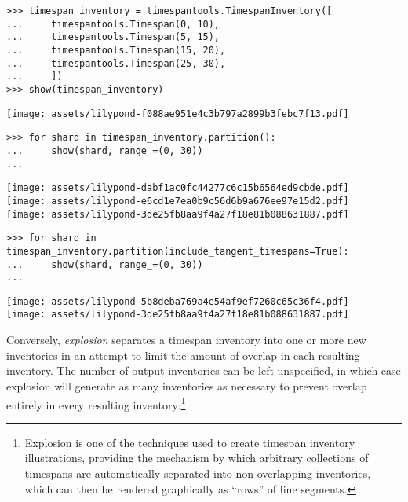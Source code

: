 \begin{abjadbookoutput}
\begin{singlespacing}
\vspace{-0.5\baselineskip}
\begin{verbatim}
>>> timespan_inventory = timespantools.TimespanInventory([
...     timespantools.Timespan(0, 10),
...     timespantools.Timespan(5, 15),
...     timespantools.Timespan(15, 20),
...     timespantools.Timespan(25, 30),
...     ])
>>> show(timespan_inventory)
\end{verbatim}
\noindent\texttt{[image: assets/lilypond-f088ae951e4c3b797a2899b3febc7f13.pdf]}
\begin{verbatim}
>>> for shard in timespan_inventory.partition():
...     show(shard, range_=(0, 30))
...
\end{verbatim}
\noindent\texttt{[image: assets/lilypond-dabf1ac0fc44277c6c15b6564ed9cbde.pdf]}\\
\noindent\texttt{[image: assets/lilypond-e6cd1e7ea0b9c56d6b9a676ee97e15d2.pdf]}\\
\noindent\texttt{[image: assets/lilypond-3de25fb8aa9f4a27f18e81b088631887.pdf]}
\begin{verbatim}
>>> for shard in timespan_inventory.partition(include_tangent_timespans=True):
...     show(shard, range_=(0, 30))
...
\end{verbatim}
\noindent\texttt{[image: assets/lilypond-5b8deba769a4e54af9ef7260c65c36f4.pdf]}\\
\noindent\texttt{[image: assets/lilypond-3de25fb8aa9f4a27f18e81b088631887.pdf]}
\end{singlespacing}
\end{abjadbookoutput}

\noindent Conversely, \emph{explosion} separates a timespan inventory into one
or more new inventories in an attempt to limit the amount of overlap in each
resulting inventory. The number of output inventories can be left unspecified,
in which case explosion will generate as many inventories as necessary to
prevent overlap entirely in every resulting inventory:\footnote{ Explosion is
one of the techniques used to create timespan inventory illustrations,
providing the mechanism by which arbitrary collections of timespans are
automatically separated into non-overlapping inventories, which can then be
rendered graphically as \enquote{rows} of line segments.}

